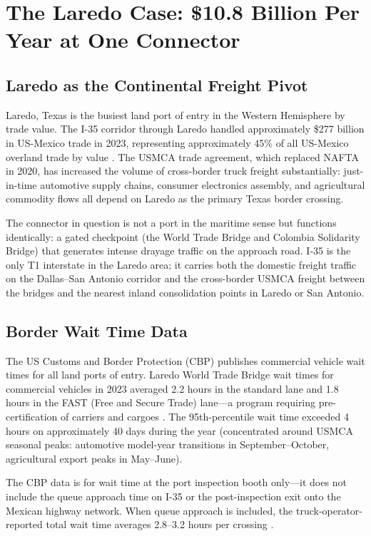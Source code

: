 \section{The Laredo Case: \$10.8 Billion Per Year at One Connector}
\label{sec:laredo}

\subsection{Laredo as the Continental Freight Pivot}

Laredo, Texas is the busiest land port of entry in the Western Hemisphere by trade value. The I-35 corridor through Laredo handled approximately \$277 billion in US-Mexico trade in 2023, representing approximately 45\% of all US-Mexico overland trade by value \citep{CBP_USMCA2023}. The USMCA trade agreement, which replaced NAFTA in 2020, has increased the volume of cross-border truck freight substantially: just-in-time automotive supply chains, consumer electronics assembly, and agricultural commodity flows all depend on Laredo as the primary Texas border crossing.

The connector in question is not a port in the maritime sense but functions identically: a gated checkpoint (the World Trade Bridge and Colombia Solidarity Bridge) that generates intense drayage traffic on the approach road. I-35 is the only T1 interstate in the Laredo area; it carries both the domestic freight traffic on the Dallas--San Antonio corridor and the cross-border USMCA freight between the bridges and the nearest inland consolidation points in Laredo or San Antonio.

\subsection{Border Wait Time Data}

The US Customs and Border Protection (CBP) publishes commercial vehicle wait times for all land ports of entry. Laredo World Trade Bridge wait times for commercial vehicles in 2023 averaged 2.2 hours in the standard lane and 1.8 hours in the FAST (Free and Secure Trade) lane---a program requiring pre-certification of carriers and cargoes \citep{CBP_USMCA2023}. The 95th-percentile wait time exceeded 4 hours on approximately 40 days during the year (concentrated around USMCA seasonal peaks: automotive model-year transitions in September--October, agricultural export peaks in May--June).

The CBP data is for wait time at the port inspection booth only---it does not include the queue approach time on I-35 or the post-inspection exit onto the Mexican highway network. When queue approach is included, the truck-operator-reported total wait time averages 2.8--3.2 hours per crossing \citep{CBP_USMCA2023}.


